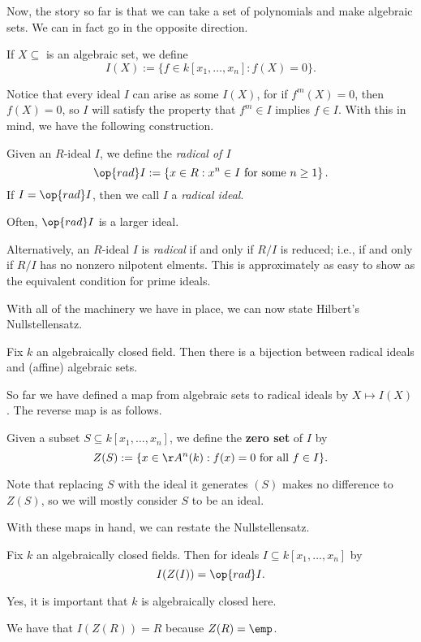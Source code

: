 Now, the story so far is that we can take a set of polynomials and make algebraic sets. We can in fact go in the opposite direction.
\begin{definition}[\texorpdfstring{$I(X)$}{I(X)}]
	If $X\subseteq$ is an algebraic set, we define
	\[I(X):=\{f\in k[x_1,\ldots,x_n]:f(X)=0\}.\]
\end{definition}
Notice that every ideal $I$ can arise as some $I(X)$, for if $f^m(X)=0$, then $f(X)=0$, so $I$ will satisfy the property that $f^m\in I$ implies $f\in I$. With this in mind, we have the following construction.
\begin{definition}[Radical]
	Given an $R$-ideal $I$, we define the \textit{radical of $I$}
	\[\op{rad}I:=\left\{x\in R:x^n\in I\text{ for some }n\ge1\right\}.\]
	If $I=\op{rad}I$, then we call $I$ a \textit{radical ideal}.
\end{definition}
Often, $\op{rad}I$ is a larger ideal.
\begin{remark}
	Alternatively, an $R$-ideal $I$ is \textit{radical} if and only if $R/I$ is reduced; i.e., if and only if $R/I$ has no nonzero nilpotent elments. This is approximately as easy to show as the equivalent condition for prime ideals.
\end{remark}
With all of the machinery we have in place, we can now state Hilbert's Nullstellensatz.
\begin{theorem}[Nullstellensatz, I]
	Fix $k$ an algebraically closed field. Then there is a bijection between radical ideals and (affine) algebraic sets.
\end{theorem}
So far we have defined a map from algebraic sets to radical ideals by $X\mapsto I(X)$. The reverse map is as follows.
\begin{definition}[\texorpdfstring{$Z(I)$}{Z(I)}]
	Given a subset $S\subseteq k[x_1,\ldots,x_n]$, we define the \textbf{zero set} of $I$ by
	\[Z(S):=\{x\in\AA^n(k):f(x)=0\text{ for all }f\in I\}.\]
\end{definition}
Note that replacing $S$ with the ideal it generates $(S)$ makes no difference to $Z(S)$, so we will mostly consider $S$ to be an ideal.

With these maps in hand, we can restate the Nullstellensatz.
\begin{theorem}[Nullstellensatz, II]
	Fix $k$ an algebraically closed fields. Then for ideals $I\subseteq k[x_1,\ldots,x_n]$ by
	\[I(Z(I))=\op{rad}I.\]
\end{theorem}
\begin{remark}
	Yes, it is important that $k$ is algebraically closed here.
\end{remark}
\begin{example}
	We have that $I(Z(R))=R$ because $Z(R)=\emp$.
\end{example}


